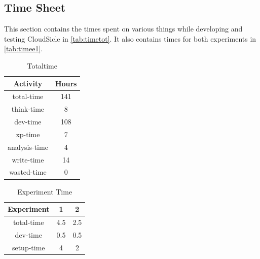 \documentclass[twocolumn,twoside]{IEEEtran}
\begin{document}
\begin{appendices}
\section{Time Sheet}
This section contains the times spent on various things while developing
and testing CloudSicle in \autoref{tab:timetot}. It also contains times for both experiments in 
\autoref{tab:timee1}.
\begin{table}[htb]
\caption{Totaltime}
\label{tab:timetot}
\begin{center}

\begin{tabular}{|c|c|}
\hline
Activity&Hours\\\hline\hline
total-time&141\\\hline
think-time&8\\\hline
dev-time&108\\\hline
xp-time&7\\\hline
analysis-time&4\\\hline
write-time&14\\\hline
wasted-time&0\\\hline
\end{tabular}

\end{center}
\end{table}
\begin{table}[htb]
\caption{Experiment Time}
\label{tab:timee1}
\begin{center}

\begin{tabular}{|c|c|c|}
\hline
Experiment&1&2\\\hline\hline
total-time&4.5&2.5\\\hline
dev-time&0.5&0.5\\\hline
setup-time&4&2\\\hline
\end{tabular}

\end{center}
\end{table}

\end{appendices}

\nocite{*}

\end{document}
